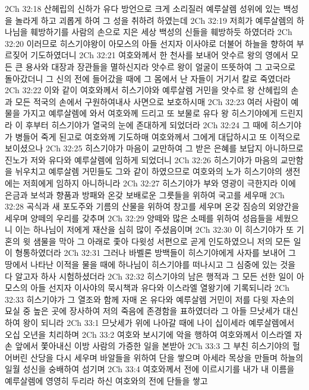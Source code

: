 2Ch 32:18  산헤립의 신하가 유다 방언으로 크게 소리질러 예루살렘 성위에 있는 백성을 놀라게 하고 괴롭게 하여 그 성을 취하려 하였는데
2Ch 32:19  저희가 예루살렘의 하나님을 훼방하기를 사람의 손으로 지은 세상 백성의 신들을 훼방하듯 하였더라
2Ch 32:20  이러므로 히스기야왕이 아모스의 아들 선지자 이사야로 더불어 하늘을 향하여 부르짖어 기도하였더니
2Ch 32:21  여호와께서 한 천사를 보내어 앗수르 왕의 영에서 모든 큰 용사와 대장과 장관들을 멸하신지라 앗수르 왕이 얼굴이 뜨뜻하여 그 고국으로 돌아갔더니 그 신의 전에 들어갔을 때에 그 몸에서 난 자들이 거기서 칼로 죽였더라
2Ch 32:22  이와 같이 여호와께서 히스기야와 예루살렘 거민을 앗수르 왕 산헤립의 손과 모든 적국의 손에서 구원하여내사 사면으로 보호하시매
2Ch 32:23  여러 사람이 예물을 가지고 예루살렘에 와서 여호와께 드리고 또 보물로 유다 왕 히스기야에게 드린지라 이 후부터 히스기야가 열국의 눈에 존대하게 되었더라
2Ch 32:24  그 때에 히스기야가 병들어 죽게 된고로 여호와께 기도하매 여호와께서 그에게 대답하시고 또 이적으로 보이셨으나
2Ch 32:25  히스기야가 마음이 교만하여 그 받은 은혜를 보답지 아니하므로 진노가 저와 유다와 예루살렘에 임하게 되었더니
2Ch 32:26  히스기야가 마음의 교만함을 뉘우치고 예루살렘 거민들도 그와 같이 하였으므로 여호와의 노가 히스기야의 생전에는 저희에게 임하지 아니하니라
2Ch 32:27  히스기야가 부와 영광이 극한지라 이에 은금과 보석과 향품과 방패와 온갖 보배로운 그릇들을 위하여 국고를 세우매
2Ch 32:28  곡식과 새 포도주와 기름의 산물을 위하여 창고를 세우며 온갖 짐승의 외양간을 세우며 양떼의 우리를 갖추며
2Ch 32:29  양떼와 많은 소떼를 위하여 성읍들을 세웠으니 이는 하나님이 저에게 재산을 심히 많이 주셨음이며
2Ch 32:30  이 히스기야가 또 기혼의 윗 샘물을 막아 그 아래로 좇아 다윗성 서편으로 곧게 인도하였으니 저의 모든 일이 형통하였더라
2Ch 32:31  그러나 바벨론 방백들이 히스기야에게 사자를 보내어 그 땅에서 나타난 이적을 물을 때에 하나님이 히스기야를 떠나시고 그 심중에 있는 것을 다 알고자 하사 시험하셨더라
2Ch 32:32  히스기야의 남은 행적과 그 모든 선한 일이 아모스의 아들 선지자 이사야의 묵시책과 유다와 이스라엘 열왕기에 기록되니라
2Ch 32:33  히스기야가 그 열조와 함께 자매 온 유다와 예루살렘 거민이 저를 다윗 자손의 묘실 중 높은 곳에 장사하여 저의 죽음에 존경함을 표하였더라 그 아들 므낫세가 대신하여 왕이 되니라
2Ch 33:1  므낫세가 위에 나아갈 때에 나이 십이세라 예루살렘에서 오십 오년을 치리하며
2Ch 33:2  여호와 보시기에 악을 행하여 여호와께서 이스라엘 자손 앞에서 쫓아내신 이방 사람의 가증한 일을 본받아
2Ch 33:3  그 부친 히스기야의 헐어버린 산당을 다시 세우며 바알들을 위하여 단을 쌓으며 아세라 목상을 만들며 하늘의 일월 성신을 숭배하여 섬기며
2Ch 33:4  여호와께서 전에 이르시기를 내가 내 이름을 예루살렘에 영영히 두리라 하신 여호와의 전에 단들을 쌓고
